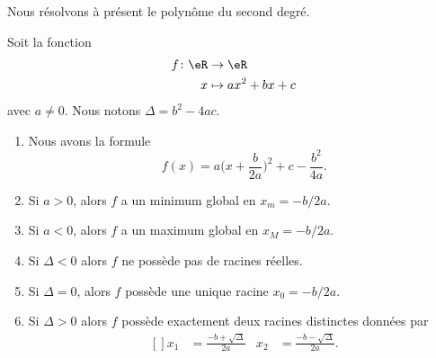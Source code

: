 Nous résolvons à présent le polynôme du second degré.
\begin{proposition}       \label{PROPooEZIKooKjJroH}
    Soit la fonction
    \begin{equation}
        \begin{aligned}
            f\colon \eR&\to \eR \\
            x&\mapsto ax^2+bx+c 
        \end{aligned}
    \end{equation}
    avec \( a\neq 0\). Nous notons \( \Delta=b^2-4ac\).

    \begin{enumerate}
        \item       \label{ITEMooMKUSooWwNTba}
            Nous avons la formule
            \begin{equation}        \label{EQooFKPOooAbIhCx}
                f(x)=a\big( x+\frac{ b }{ 2a } \big)^2+c-\frac{ b^2 }{ 4a }.
            \end{equation}
        \item       \label{ITEMooHQTBooZuaPAs}
            Si \( a>0\), alors \( f\) a un minimum global en \( x_m=-b/2a\).
        \item       \label{ITEMooQMXVooWsqiXz}
            Si \( a<0\), alors \( f\) a un maximum global en \( x_M=-b/2a\).
        \item       \label{ITEMooMAMHooNWZVQI}
            Si \( \Delta<0\) alors \( f\) ne possède pas de racines réelles.
        \item       \label{ITEMooKUUJooTsIHhI}
            Si \( \Delta=0\), alors \( f\) possède une unique racine \( x_0=-b/2a\).
        \item       \label{ITEMooQZGFooEGhMkX}
            Si \( \Delta>0\) alors \( f\) possède exactement deux racines distinctes données par
            \begin{equation}        \label{EQooGHDPooVkqINr}
                \begin{aligned}[]
                    x_1&=\frac{ -b+\sqrt{ \Delta } }{ 2a }&x_2&=\frac{ -b-\sqrt{ \Delta } }{ 2a }.
                \end{aligned}
            \end{equation}
    \end{enumerate}
\end{proposition}

